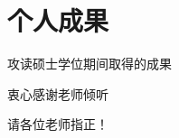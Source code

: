 \documentclass{beamer}
\begin{document}
\section{个人成果}

\begin{frame}[allowframebreaks]{攻读硕士学位期间取得的成果}
    \newcommand{\bstlabelmark}{lo}
    \nocite{*}
    
    
\end{frame}

\begin{frame}
    \begin{center}
        {\Huge 衷心感谢老师倾听}

        {\Huge 请各位老师指正！}
    \end{center}
\end{frame}
\end{document}
